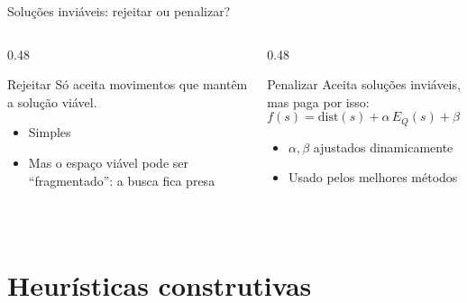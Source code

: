 \documentclass[aspectratio=169,xcolor=table]{beamer}
\begin{document}
\begin{frame}{Soluções inviáveis: rejeitar ou penalizar?}
  \begin{columns}[T]
    \begin{column}{0.48\textwidth}
      \begin{block}{Rejeitar}
        Só aceita movimentos que mantêm a solução viável.
        \begin{itemize}
          \item Simples
          \item Mas o espaço viável pode ser ``fragmentado'': a busca fica presa
        \end{itemize}
      \end{block}
      \vspace{1em}
      \centering
      \\
    \end{column}
    \begin{column}{0.48\textwidth}
      \begin{block}{Penalizar}
        Aceita soluções inviáveis, mas paga por isso:
        \[
          f(s) = \text{dist}(s) + \alpha\, E_Q(s) + \beta\, E_L(s)
        \]
        \begin{itemize}
          \item $\alpha, \beta$ ajustados dinamicamente
          \item Usado pelos melhores métodos \cite{cordeau1997tabu,vidal2022hgs}
        \end{itemize}
      \end{block}
    \end{column}
  \end{columns}
\end{frame}

\section{Heurísticas construtivas}
\end{document}
